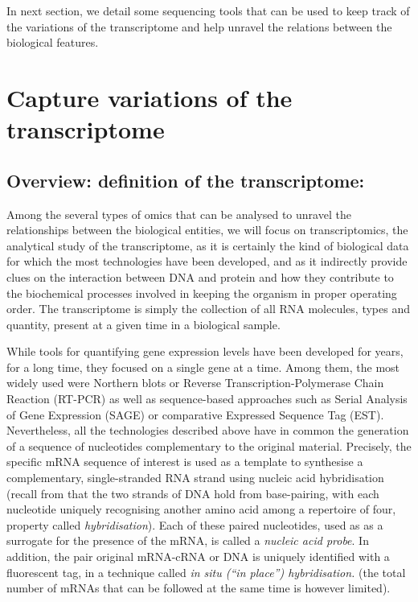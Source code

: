 In next section, we detail some sequencing tools that can be used to keep track of the variations of the transcriptome and help unravel the relations between the biological features. 

\section{Capture variations of the transcriptome}
\subsection{Overview: definition of the transcriptome:} 
\label{subsec:transcriptome-overview}
Among the several types of omics that can be analysed to unravel the relationships between the biological entities, we will focus on transcriptomics, the analytical study of the transcriptome, as it is certainly the kind of biological data for which the most technologies have been developed, and as it indirectly provide clues on the interaction between DNA and protein and how they contribute to the biochemical processes involved in keeping the organism in proper operating order. The transcriptome is simply the collection of all RNA molecules, types and quantity, present at a given time in a biological sample.  

While tools for quantifying gene expression levels have been developed for years, for a long time, they focused on a single gene at a time. Among them, the most widely used were Northern blots or Reverse Transcription-Polymerase Chain Reaction (RT-PCR) as well as sequence-based approaches such as Serial Analysis of Gene Expression (SAGE) or comparative Expressed Sequence Tag (EST). Nevertheless, all the technologies described above have in common the generation of a sequence of nucleotides complementary to the original material. Precisely, the specific mRNA sequence of interest is used as a template to synthesise a complementary, single-stranded RNA strand using nucleic acid hybridisation (recall from  that the two strands of DNA hold from base-pairing, with each nucleotide uniquely recognising another amino acid among a repertoire of four, property called \textit{hybridisation}). Each of these paired nucleotides, used as as a surrogate for the presence of the mRNA, is called a \textit{nucleic acid probe}. In addition, the pair original mRNA-cRNA or DNA is uniquely identified with a fluorescent tag, in a technique called \textit{in situ (\enquote{in place}) hybridisation.} (the total number of mRNAs that can be followed at the same time is however limited). 


